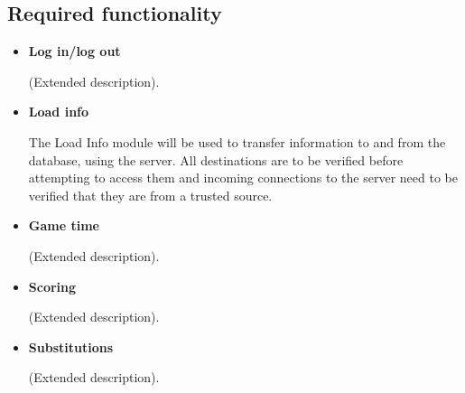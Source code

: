 \documentclass[a4paper,12pt]{report}
\begin{document}
\subsection{Required functionality}
\begin{itemize}
	\item \textbf{Log in/log out}
		\begin{flushleft}
		 (Extended description).	
		\end{flushleft}
		\begin{center}
		\end{center}
\newpage
\item \textbf{Load info}
		\begin{flushleft}
			The Load Info module will be used to transfer information to and from the database, using the server. All destinations are to be verified before attempting to access them and incoming connections to the server need to be verified that they are from a trusted source.
		\end{flushleft}
		\begin{center}
		\end{center}
\item  \textbf{Game time}
		\begin{flushleft}
		 (Extended description).	
		\end{flushleft}
		\begin{center}
		\end{center}
\item \textbf{Scoring}
		\begin{flushleft}
		 (Extended description).	
		\end{flushleft}
		\begin{center}
		\end{center}
\newpage
	\item \textbf{Substitutions}
		\begin{flushleft}
		 (Extended description).
		\end{flushleft}
		\begin{center}

\end{center}
\end{itemize}
\end{document}
